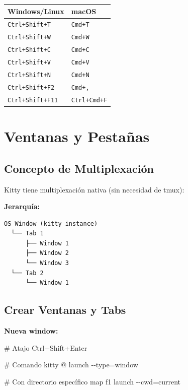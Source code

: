 \documentclass[
  doc,
  floatsintext,
  longtable,
  a4paper,
  nolmodern,
  notxfonts,
  notimes,
  12pt,
  colorlinks=true,linkcolor=blue,citecolor=blue,urlcolor=blue]{apa7}
\newenvironment{Shaded}{\begin{snugshade}}{\end{snugshade}}
\newcommand{\AttributeTok}[1]{\textcolor[rgb]{0.40,0.45,0.13}{#1}}
\newcommand{\CommentTok}[1]{\textcolor[rgb]{0.37,0.37,0.37}{#1}}
\newcommand{\ExtensionTok}[1]{\textcolor[rgb]{0.00,0.23,0.31}{#1}}
\newcommand{\NormalTok}[1]{\textcolor[rgb]{0.00,0.23,0.31}{#1}}
\newcommand{\OperatorTok}[1]{\textcolor[rgb]{0.37,0.37,0.37}{#1}}
\newcounter{none} %
\begin{document}
{\def\LTcaptype{none} %
\begin{longtable}[]{@{}ll@{}}
\toprule\noalign{}
Windows/Linux & macOS \\
\midrule\noalign{}
\endhead
\bottomrule\noalign{}
\endlastfoot
\texttt{Ctrl+Shift+T} & \texttt{Cmd+T} \\
\texttt{Ctrl+Shift+W} & \texttt{Cmd+W} \\
\texttt{Ctrl+Shift+C} & \texttt{Cmd+C} \\
\texttt{Ctrl+Shift+V} & \texttt{Cmd+V} \\
\texttt{Ctrl+Shift+N} & \texttt{Cmd+N} \\
\texttt{Ctrl+Shift+F2} & \texttt{Cmd+,} \\
\texttt{Ctrl+Shift+F11} & \texttt{Ctrl+Cmd+F} \\
\end{longtable}
}

\section{Ventanas y Pestañas}\label{ventanas-y-pestauxf1as}

\subsection{Concepto de
Multiplexación}\label{concepto-de-multiplexaciuxf3n}

Kitty tiene multiplexación nativa (sin necesidad de tmux):

\textbf{Jerarquía:}

\begin{verbatim}
OS Window (kitty instance)
  └── Tab 1
      ├── Window 1
      ├── Window 2
      └── Window 3
  └── Tab 2
      └── Window 1
\end{verbatim}

\subsection{Crear Ventanas y Tabs}\label{crear-ventanas-y-tabs}

\textbf{Nueva window:}

\begin{Shaded}
\begin{Highlighting}[]
\CommentTok{\# Atajo}
\ExtensionTok{Ctrl+Shift+Enter}

\CommentTok{\# Comando}
\ExtensionTok{kitty}\NormalTok{ @ launch }\AttributeTok{{-}{-}type}\OperatorTok{=}\NormalTok{window}

\CommentTok{\# Con directorio específico}
\ExtensionTok{map}\NormalTok{ f1 launch }\AttributeTok{{-}{-}cwd}\OperatorTok{=}\NormalTok{current}
\end{Highlighting}
\end{Shaded}
\end{document}

